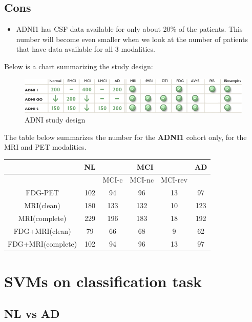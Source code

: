 \documentclass[12pt,a4paper]{article}
\begin{document}
\subsection{Cons}

\begin{itemize}
\item ADNI1 has CSF data available for only about 20\% of the
  patients. This number will become even smaller when we look at the
  number of patients that have data available for all 3 modalities.
\end{itemize}

Below is a chart summarizing the study design:

\begin{figure}[ht]
  \centering
  \includegraphics[width=\textwidth]{study-design.png}
  \caption{\label{fig:design}ADNI study design}
\end{figure}

The table below summarizes the number for the \textbf{ADNI1} cohort
only, for the MRI and PET modalities.

\begin{tabular}[H]{c | c | c | c | c | c}
  & NL & \multicolumn{3}{|c|}{MCI} & AD\\
\hline
& & MCI-c & MCI-nc & MCI-rev &\\
\hline
FDG-PET & 102 & 94 & 96 & 13 & 97\\
MRI(clean) & 180 & 133 & 132 & 10 & 123\\
MRI(complete) & 229 & 196 & 183 & 18 & 192\\
FDG+MRI(clean) & 79 & 66 & 68 & 9 & 62\\
FDG+MRI(complete) & 102 & 94 & 96 & 13 & 97\\
\end{tabular}

\section{SVMs on classification task}
\label{sec:svm}

\subsection{NL vs AD}
\label{sec:nl-vs-ad}
\end{document}
